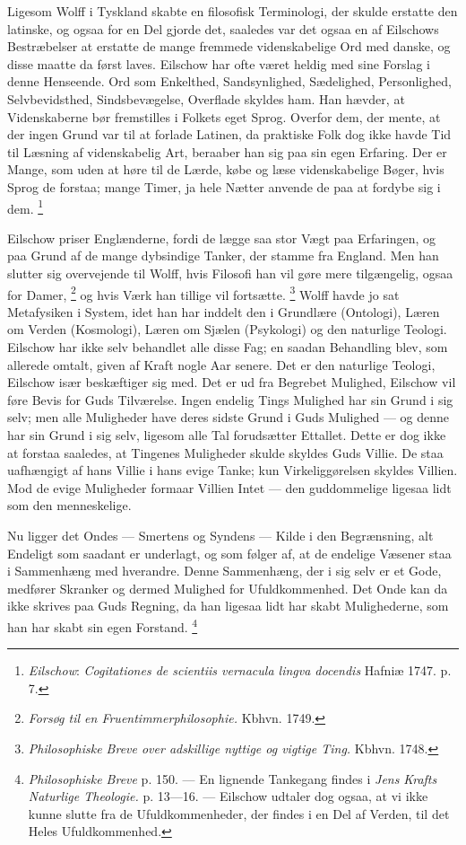 \documentclass[12pt,a4paper,openany]{book}
\newcommand{\opage}[1]{\marginnote{\footnotesize\textit{[#1]}}}
\begin{document}
Ligesom Wolff i Tyskland skabte en filosofisk Terminologi, der skulde erstatte
den latinske, og ogsaa for en Del gjorde det, saaledes var det ogsaa en af
Eilschows Bestræbelser at erstatte de mange fremmede videnskabelige Ord med
danske, og disse maatte da først laves. Eilschow har ofte været heldig med sine
Forslag i denne Henseende. Ord som Enkelthed, Sandsynlighed, Sædelighed,
Personlighed, Selvbevidsthed, Sindsbevægelse, Overflade skyldes ham. Han
hævder, at Videnskaberne bør fremstilles i Folkets eget Sprog. Overfor dem, der
mente, at der ingen Grund var til at forlade Latinen, da praktiske Folk dog
ikke havde Tid til Læsning af videnskabelig Art, beraaber han sig paa sin egen
Erfaring. Der er Mange, som uden at høre til de Lærde, købe og læse
videnskabelige Bøger, hvis Sprog de forstaa; mange Timer, ja hele Nætter
anvende de paa at fordybe sig i dem.%
\footnote[1]{\emph{Eilschow}: \textit{Cogitationes de scientiis vernacula
lingva docendis} Hafniæ 1747. p. 7.}

Eilschow priser Englænderne, fordi de lægge saa stor Vægt paa Erfaringen, og
paa Grund af de mange dybsindige Tanker, der stamme fra England. Men han
slutter sig overvejende til Wolff, hvis Filosofi han vil gøre mere tilgængelig,
ogsaa for Damer,%
\footnote[2]{\textit{Forsøg til en Fruentimmerphilosophie.} Kbhvn. 1749.} og
hvis Værk han tillige vil fortsætte.%
\footnote[3]{\textit{Philosophiske Breve over adskillige nyttige og vigtige
Ting.} Kbhvn. 1748.} Wolff havde jo sat Metafysiken i System, idet han har
inddelt den i Grundlære (Ontologi), Læren om Verden (Kosmologi), Læren om
Sjælen (Psykologi) og den naturlige Teologi. Eilschow har ikke selv behandlet
alle disse Fag; en saadan Behandling blev, som allerede omtalt, given af Kraft
nogle Aar senere. Det er den naturlige Teologi, Eilschow
\setcounter{footnote}{0}%
\opage{22}især beskæftiger sig med. Det er ud fra Begrebet Mulighed, Eilschow
vil føre Bevis for Guds Tilværelse. Ingen endelig Tings Mulighed har sin Grund
i sig selv; men alle Muligheder have deres sidste Grund i Guds Mulighed --- og
denne har sin Grund i sig selv, ligesom alle Tal forudsætter Ettallet. Dette er
dog ikke at forstaa saaledes, at Tingenes Muligheder skulde skyldes Guds
Villie. De staa uafhængigt af hans Villie i hans evige Tanke; kun
Virkeliggørelsen skyldes Villien. Mod de evige Muligheder formaar Villien Intet
--- den guddommelige ligesaa lidt som den menneskelige.

Nu ligger det Ondes --- Smertens og Syndens --- Kilde i den Begrænsning, alt
Endeligt som saadant er underlagt, og som følger af, at de endelige Væsener
staa i Sammenhæng med hverandre. Denne Sammenhæng, der i sig selv er et Gode,
medfører Skranker og dermed Mulighed for Ufuldkommenhed. Det Onde kan da ikke
skrives paa Guds Regning, da han ligesaa lidt har skabt Mulighederne, som han
har skabt sin egen Forstand.%
\footnote[1]{\textit{Philosophiske Breve} p. 150. --- En lignende Tankegang
findes i \emph{Jens} \emph{Krafts} \textit{Naturlige Theologie.} p. 13---16.
--- Eilschow udtaler dog ogsaa, at vi ikke kunne slutte fra de
Ufuldkommenheder, der findes i en Del af Verden, til det Heles Ufuldkommenhed.}
\end{document}
